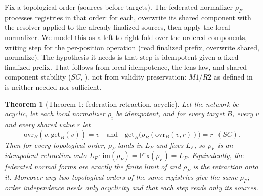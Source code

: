 \documentclass[11pt,a4paper]{article}
\theoremstyle{plain}
\newtheorem{theorem}{Theorem}[section]
\theoremstyle{definition}
\theoremstyle{remark}
\renewcommand{\_}{\origunderscore\allowbreak}
\begin{document}
Fix a topological order (sources before targets). The federated normalizer $\rho_F$ processes
registries in that order: for each, overwrite its shared component with the resolver applied to the
already-finalized sources, then apply the local normalizer. We model this as a left-to-right fold
over the ordered components, writing $\mathrm{step}$ for the per-position operation (read finalized
prefix, overwrite shared, normalize). The hypothesis it needs is that $\mathrm{step}$ is idempotent
given a fixed finalized prefix. That follows from local idempotence, the lens law, and
shared-component stability ($SC$, ), not from validity preservation: $M1/R2$ as
defined in  is neither needed nor sufficient.

\begin{theorem}[Theorem 1: federation retraction, acyclic]
\label{thm:one}
Let the network be acyclic, let each local normalizer $\rho_i$ be idempotent, and for every target
$B$, every $v$ and every shared value $r$ let
\[ \mathrm{ovr}_B(v, \mathrm{get}_B(v)) = v \quad\text{and}\quad
   \mathrm{get}_B\big(\rho_B(\mathrm{ovr}_B(v, r))\big) = r \ \ (SC). \]
Then for every topological order, $\rho_F$ lands in $L_F$ and fixes $L_F$, so $\rho_F$ is an
idempotent retraction onto $L_F$: $\mathrm{im}(\rho_F) = \mathrm{Fix}(\rho_F) = L_F$. Equivalently,
the federated normal forms are exactly the finite limit of  and $\rho_F$ is the
retraction onto it. Moreover any two topological orders of the same registries give the same
$\rho_F$; order independence needs only acyclicity and that each step reads only its sources.
\end{theorem}
\end{document}
